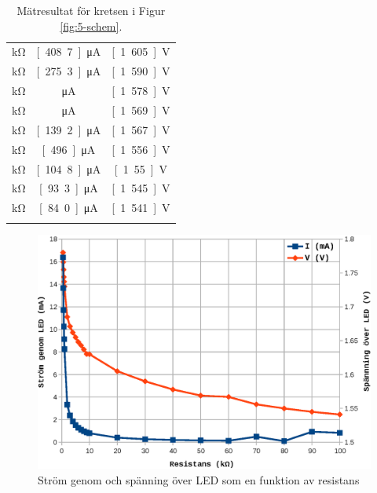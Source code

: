 \documentclass[11pt,a4paper]{article}
\begin{document}
\begin{longtable}[c]{@{}ccc@{}}
\unit[20]{\si{\kohm}} & \unit[408.7]{\si{\unit{\uA}}} & \unit[1.605]{\si{\volt}}
\\\addlinespace
\unit[30]{\si{\kohm}} & \unit[275.3]{\si{\unit{\uA}}} & \unit[1.590]{\si{\volt}}
\\\addlinespace
\unit[40]{\si{\kohm}} & \unit[2077]{\si{\unit{\uA}}} & \unit[1.578]{\si{\volt}}
\\\addlinespace
\unit[50]{\si{\kohm}} & \unit[1667]{\si{\unit{\uA}}} & \unit[1.569]{\si{\volt}}
\\\addlinespace
\unit[60]{\si{\kohm}} & \unit[139.2]{\si{\unit{\uA}}} & \unit[1.567]{\si{\volt}}
\\\addlinespace
\unit[70]{\si{\kohm}} & \unit[496.]{\si{\unit{\uA}}} & \unit[1.556]{\si{\volt}}
\\\addlinespace
\unit[80]{\si{\kohm}} & \unit[104.8]{\si{\unit{\uA}}} & \unit[1.55]{\si{\volt}}
\\\addlinespace
\unit[90]{\si{\kohm}} & \unit[93.3]{\si{\unit{\uA}}} & \unit[1.545]{\si{\volt}}
\\\addlinespace
\unit[100]{\si{\kohm}} & \unit[84.0]{\si{\unit{\uA}}} & \unit[1.541]{\si{\volt}}
\\\addlinespace
\bottomrule
\addlinespace
\caption[]{Mätresultat för kretsen i Figur \ref{fig:5-schem}.}
\label{6-table}
\end{longtable}

\begin{figure}
    \centering
    \includegraphics[width=\linewidth]{img/6-led_data-graf}
    \caption[Spänning och ström genom LED som funktion av serieresistans]
    {Ström genom och spänning över LED som en funktion av resistans}
    \label{fig:led-data-graf}
\end{figure}
\end{document}
